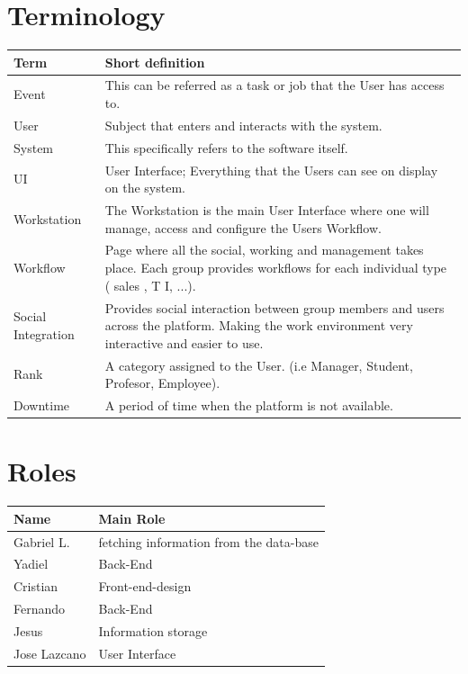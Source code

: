 \documentclass{article}[draft]
\begin{document}
\section{Terminology}
\begin{center}

    \begin{tabular}{| l | p{5cm} |}\hline
    Term & Short definition \\ \hline
    Event & This can be referred as a task or job that the User has access to. \\ \hline
    User & Subject that enters and interacts with the system. \\ \hline
    System & This specifically refers to the software itself. \\ \hline
    UI & User Interface; Everything that the Users can see on display on the system. \\ \hline
    Workstation & The Workstation is the main User Interface where one will manage, access and configure the Users Workflow. \\ \hline
    Workflow & Page where all the social, working and management takes place. Each group provides workflows for each individual type ( sales
    , T I, ...). \\ \hline
    Social Integration & Provides social interaction between group members and users across the platform. Making the work environment very interactive
    and easier to use. \\ \hline
    Rank & A category assigned to the User. (i.e Manager, Student, Profesor, Employee). \\ \hline
    Downtime & A period of time when the platform is not available. \\ \hline
    \end{tabular}

\end{center}
\section{Roles}

\begin{center}

\begin{tabular}{| l | p{5cm} |}\hline
Name & Main Role \\ \hline
Gabriel L. & fetching information from the data-base\\ \hline
Yadiel     & Back-End\\ \hline
Cristian   & Front-end-design \\ \hline
Fernando   & Back-End \\ \hline
Jesus	   & Information storage\\ \hline
Jose Lazcano  & User Interface \\ \hline
\end{tabular}

\end{center}
\end{document}

